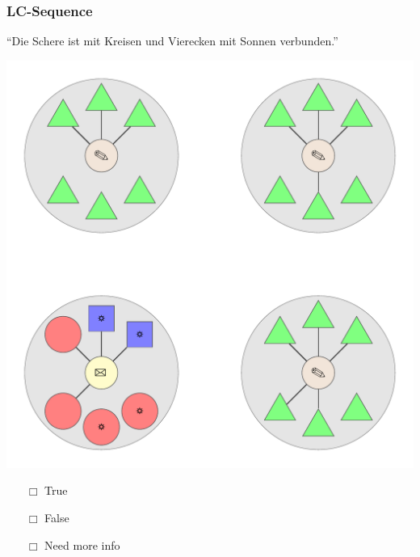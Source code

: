 \documentclass[fleqn,10pt,serif,xcolor=dvipsnames]{beamer}
\newcommand{\LC}{LC}
\newcommand{\mymark}[1]{{\color{blue}{#1}}}
\begin{document}
\begin{frame}
  \frametitle{\LC-Sequence}
  \begin{center}
    ``Die Schere ist mit Kreisen und Vierecken mit Sonnen verbunden.''

    \vspace{0.1cm}

    \includegraphics[width=0.5 \textwidth]{../../pictures/lc_01_7.pdf}

    \vspace{0.1cm}

    \begin{multicols}{3}
      \begin{itemize} 
      \item[$\Box$] True\\
        \onslide<2>{$\leadsto$  \mymark{false}}
      \item[$\Box$] False\\
        \onslide<2>{$\leadsto$ \mymark{false}}
      \item[$\Box$] Need more info 
      \end{itemize}
    \end{multicols}

  \end{center}
\end{frame}
\end{document}
